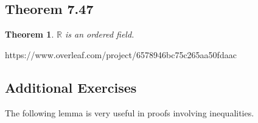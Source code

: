 \documentclass[openany, amssymb, psamsfonts]{amsart}
\newcommand{\bbR}{\mathbb{R}}
\newtheorem{thm}{Theorem}[section]
\theoremstyle{definition}
\numberwithin{equation}{section}
\begin{document}
\subsection*{Theorem 7.47}
\begin{thm}
\label{7.47}
	$\bbR$ is an ordered field. 
\end{thm}
https://www.overleaf.com/project/6578946bc75c265aa50fdaac
\begin{center}
\section{Additional Exercises}
\end{center}

The following lemma is very useful in proofs involving inequalities.
\end{document}
